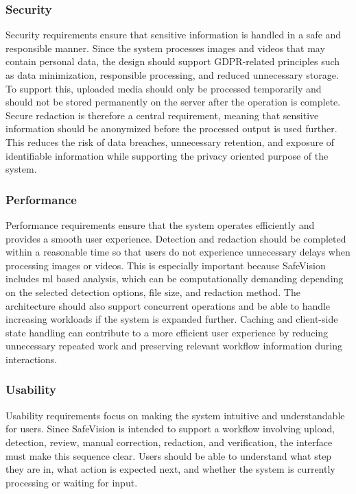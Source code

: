 \subsubsection{Security}

Security requirements ensure that sensitive information is handled in a safe and responsible manner. Since the system processes images and videos that may contain personal data, the design should support GDPR-related principles such as data minimization, responsible processing, and reduced unnecessary storage. To support this, uploaded media should only be processed temporarily and should not be stored permanently on the server after the operation is complete. Secure redaction is therefore a central requirement, meaning that sensitive information should be anonymized before the processed output is used further. This reduces the risk of data breaches, unnecessary retention, and exposure of identifiable information while supporting the privacy oriented purpose of the system.

\subsubsection{Performance}

Performance requirements ensure that the system operates efficiently and provides a smooth user experience. Detection and redaction should be completed within a reasonable time so that users do not experience unnecessary delays when processing images or videos. This is especially important because \gls{SafeVision} includes \acrshort{ml} based analysis, which can be computationally demanding depending on the selected detection options, file size, and redaction method. The architecture should also support concurrent operations and be able to handle increasing workloads if the system is expanded further. Caching and client-side state handling can contribute to a more efficient user experience by reducing unnecessary repeated work and preserving relevant workflow information during interactions.

\subsubsection{Usability}

Usability requirements focus on making the system intuitive and understandable for users. Since \gls{SafeVision} is intended to support a workflow involving upload, detection, review, manual correction, redaction, and verification, the interface must make this sequence clear. Users should be able to understand what step they are in, what action is expected next, and whether the system is currently processing or waiting for input.

